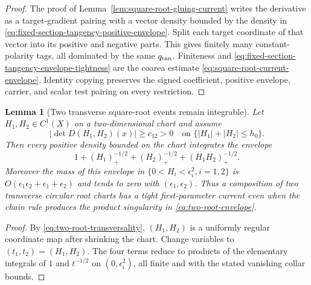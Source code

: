 \documentclass[11pt]{article}
\newtheorem{lemma}[theorem]{Lemma}
\begin{document}
\begin{proof}
The proof of Lemma~\ref{lem:square-root-gluing-current} writes the derivative
as a target-gradient pairing with a vector density bounded by the density in
\eqref{eq:fixed-section-tangency-positive-envelope}.  Split each target
coordinate of that vector into its positive and negative parts.  This gives
finitely many constant-polarity tags, all dominated by the same $q_{\rm tan}$.
Finiteness and \eqref{eq:fixed-section-tangency-envelope-tightness} are the
coarea estimate \eqref{eq:square-root-current-envelope}.  Identity copying
preserves the signed coefficient, positive envelope, carrier, and scalar
test pairing on every restriction.
\end{proof}

\begin{lemma}[Two transverse square-root events remain integrable]
\label{lem:two-root-integrability}
Let $H_1,H_2\in C^1(X)$ on a two-dimensional chart and assume
\begin{equation}
\label{eq:two-root-transversality}
 |\det D(H_1,H_2)(x)|\ge c_{12}>0
 \quad\text{on }\{|H_1|+|H_2|\le h_0\}.
\end{equation}
Then every positive density bounded on the chart integrates the envelope
\begin{equation}
\label{eq:two-root-envelope}
 1+(H_1)_+^{-1/2}+(H_2)_+^{-1/2}
   +(H_1H_2)_+^{-1/2}.
\end{equation}
Moreover the mass of this envelope in
$\{0<H_i<\epsilon_i^2, i=1,2\}$ is
$O(\epsilon_1\epsilon_2+\epsilon_1+\epsilon_2)$
and tends to zero with $(\epsilon_1,\epsilon_2)$.  Thus a composition of two
transverse circular root charts has a tight first-parameter current even
when the chain rule produces the product singularity in
\eqref{eq:two-root-envelope}.
\end{lemma}

\begin{proof}
By \eqref{eq:two-root-transversality}, $(H_1,H_2)$ is a uniformly regular
coordinate map after shrinking the chart.  Change variables to
$(t_1,t_2)=(H_1,H_2)$.  The four terms reduce to products of the elementary
integrals of $1$ and $t^{-1/2}$ on $(0,\epsilon_i^2)$, all finite and with
the stated vanishing collar bounds.
\end{proof}
\end{document}
